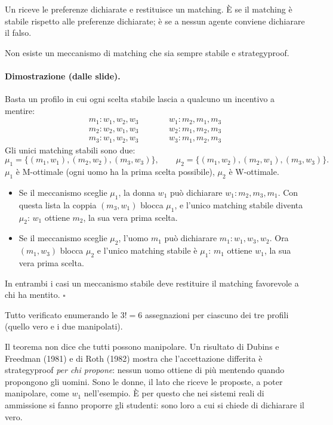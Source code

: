 Un  riceve le preferenze dichiarate e restituisce un matching. È
 se il matching è stabile rispetto alle preferenze dichiarate; è
 se a nessun agente conviene dichiarare il falso.

\begin{teorema}[Roth, 1982]
Non esiste un meccanismo di matching che sia sempre stabile e strategyproof.
\end{teorema}
\paragraph{Dimostrazione (dalle slide).} Basta un profilo in cui ogni scelta stabile
lascia a qualcuno un incentivo a mentire:
\[
\begin{array}{lll}
  m_1: w_1, w_2, w_3 & \qquad & w_1: m_2, m_1, m_3 \\
  m_2: w_2, w_1, w_3 & \qquad & w_2: m_1, m_2, m_3 \\
  m_3: w_1, w_2, w_3 & \qquad & w_3: m_1, m_2, m_3
\end{array}
\]
Gli unici matching stabili sono due:
\[
  \mu_1 = \{(m_1, w_1), (m_2, w_2), (m_3, w_3)\}, \qquad
  \mu_2 = \{(m_1, w_2), (m_2, w_1), (m_3, w_3)\}.
\]
$\mu_1$ è M-ottimale (ogni uomo ha la prima scelta possibile), $\mu_2$ è W-ottimale.
\begin{itemize}
  \item Se il meccanismo sceglie $\mu_1$, la donna $w_1$ può dichiarare
        $w_1: m_2, m_3, m_1$. Con questa lista la coppia $(m_3, w_1)$ blocca $\mu_1$, e
        l'unico matching stabile diventa $\mu_2$: $w_1$ ottiene $m_2$, la sua vera prima
        scelta.
  \item Se il meccanismo sceglie $\mu_2$, l'uomo $m_1$ può dichiarare $m_1: w_1, w_3, w_2$.
        Ora $(m_1, w_3)$ blocca $\mu_2$ e l'unico matching stabile è $\mu_1$: $m_1$ ottiene
        $w_1$, la sua vera prima scelta.
\end{itemize}
In entrambi i casi un meccanismo stabile deve restituire il matching favorevole a chi ha
mentito. \hfill$\square$

Tutto verificato enumerando le $3! = 6$ assegnazioni per ciascuno dei tre profili (quello
vero e i due manipolati).

\begin{osservazione}
Il teorema non dice che tutti possono manipolare. Un risultato di Dubins e Freedman (1981)
e di Roth (1982) mostra che l'accettazione differita è strategyproof \emph{per chi
propone}: nessun uomo ottiene di più mentendo quando propongono gli uomini. Sono le donne,
il lato che riceve le proposte, a poter manipolare, come $w_1$ nell'esempio. È per questo
che nei sistemi reali di ammissione si fanno proporre gli studenti: sono loro a cui si
chiede di dichiarare il vero.
\end{osservazione}

